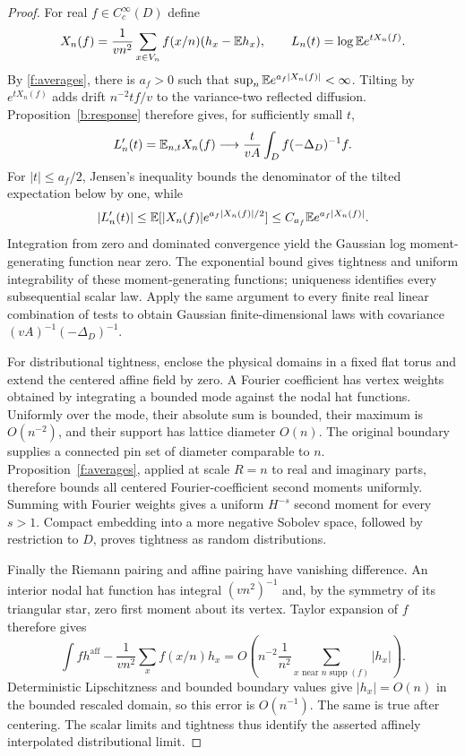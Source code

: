 \begin{proof}
For real $f\in C_c^\infty(D)$ define
\[
 X_n(f)=\frac1{vn^2}\sum_{x\in V_n}
             f(x/n)(h_x-\mathbb E h_x),
 \qquad L_n(t)=\log\mathbb E e^{tX_n(f)}.
\]
By \ref{f:averages}, there is $a_f>0$ such that
$\sup_n\mathbb E e^{a_f|X_n(f)|}<\infty$. Tilting by $e^{tX_n(f)}$
adds drift $n^{-2}tf/v$ to the variance-two reflected diffusion.
Proposition~\ref{b:response} therefore gives, for sufficiently small $t$,
\[
 L_n'(t)=\mathbb E_{n,t}X_n(f)
 \longrightarrow \frac{t}{vA}\int_D f(-\Delta_D)^{-1}f.
\]
For $|t|\le a_f/2$, Jensen's inequality bounds the denominator of the
tilted expectation below by one, while
\[
 |L_n'(t)|\le\mathbb E[|X_n(f)|e^{a_f|X_n(f)|/2}]
             \le C_{a_f}\mathbb E e^{a_f|X_n(f)|}.
\]
Integration from zero and dominated convergence yield the Gaussian log
moment-generating function near zero. The exponential bound gives
tightness and uniform integrability of these moment-generating functions;
uniqueness identifies every subsequential scalar law. Apply the same
argument to every finite real linear combination of tests to obtain
Gaussian finite-dimensional laws with covariance
$(vA)^{-1}(-\Delta_D)^{-1}$.

For distributional tightness, enclose the physical domains in a fixed
flat torus and extend the centered affine field by zero. A Fourier
coefficient has vertex weights obtained by integrating a bounded mode
against the nodal hat functions. Uniformly over the mode, their absolute
sum is bounded, their maximum is $O(n^{-2})$, and their support has
lattice diameter $O(n)$. The original boundary supplies a connected
pin set of diameter comparable to $n$. Proposition~\ref{f:averages},
applied at scale $R=n$ to real and imaginary parts, therefore bounds
all centered Fourier-coefficient second moments uniformly. Summing
with Fourier weights gives a uniform $H^{-s}$ second moment for every
$s>1$. Compact embedding into a more negative Sobolev space, followed
by restriction to $D$, proves tightness as random distributions.

Finally the Riemann pairing and affine pairing have vanishing difference.
An interior nodal hat function has integral $(vn^2)^{-1}$ and, by the
symmetry of its triangular star, zero first moment about its vertex.
Taylor expansion of $f$ therefore gives
\[
 \int f h^{\mathrm{aff}}-\frac1{vn^2}\sum_xf(x/n)h_x
 =O\!\left(n^{-2}\frac1{n^2}
                 \sum_{x\text{ near }n\operatorname{supp}(f)}|h_x|\right).
\]
Deterministic Lipschitzness and bounded boundary values give
$|h_x|=O(n)$ in the bounded rescaled domain, so this error is $O(n^{-1})$.
The same is true after centering. The scalar limits and tightness thus
identify the asserted affinely interpolated distributional limit.
\end{proof}
